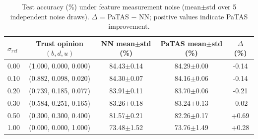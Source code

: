 \begin{table}[ht]
\centering
\caption{Test accuracy (\%) under feature measurement noise (mean$\pm$std over 5 independent noise draws). $\Delta$ = PaTAS $-$ NN; positive values indicate PaTAS improvement.}
\label{tab:feature-noise}
\begin{tabular}{lcccc}
\toprule
$\sigma_{rel}$ & Trust opinion $(b,d,u)$ & NN mean$\pm$std (\%) & PaTAS mean$\pm$std (\%) & $\Delta$ (\%) \\
\midrule
0.00 & (1.000, 0.000, 0.000) & 84.43$\pm$0.14 & 84.29$\pm$0.00 & -0.14 \\
0.10 & (0.882, 0.098, 0.020) & 84.30$\pm$0.07 & 84.16$\pm$0.06 & -0.14 \\
0.20 & (0.739, 0.185, 0.077) & 83.91$\pm$0.11 & 83.70$\pm$0.06 & -0.21 \\
0.30 & (0.584, 0.251, 0.165) & 83.26$\pm$0.18 & 83.24$\pm$0.13 & -0.02 \\
0.50 & (0.300, 0.300, 0.400) & 81.57$\pm$0.21 & 82.26$\pm$0.17 & +0.69 \\
1.00 & (0.000, 0.000, 1.000) & 73.48$\pm$1.52 & 73.76$\pm$1.49 & +0.28 \\
\bottomrule
\end{tabular}
\end{table}